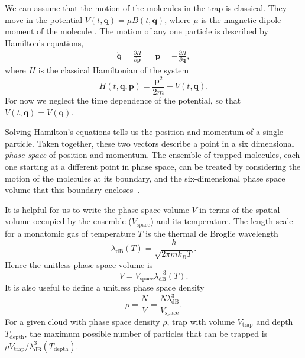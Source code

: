 We can assume that the motion of the molecules in the trap is classical. They
move in the potential $V(t, \mathbf{q}) = \mu B(t, \mathbf{q})$, where $\mu$ is
the magnetic dipole moment of the molecule .  The motion of any one particle is
described by Hamilton's equations,~\cite{Lichtenberg1969}
%
\begin{align}
  \label{design:eq:hamilton}
  \dot{\mathbf{q}} =  \frac{\partial H}{\partial \mathbf{p}} &&
  \dot{\mathbf{p}} = -\frac{\partial H}{\partial \mathbf{q}},
\end{align}
%
where $H$ is the classical Hamiltonian of the system
\begin{equation}
  H(t, \mathbf{q}, \mathbf{p}) = \frac{\mathbf{p}^2}{2m} + V(t, \mathbf{q}).
\end{equation}
For now we neglect the time dependence of the potential, so that $V(t,
\mathbf{q}) = V(\mathbf{q})$.

Solving Hamilton's equations tells us the position and momentum of a single
particle. Taken together, these two vectors describe a point in a six
dimensional \emph{phase space} of position and momentum. The ensemble of
trapped molecules, each one starting at a different point in phase space, can
be treated by considering the motion of the molecules at its
boundary, and the six-dimensional phase space volume that this
boundary encloses~\cite{Hand1998}.

It is helpful for us to write the phase space volume $V$ in terms of the
spatial volume occupied by the ensemble ($V_\text{space}$) and its temperature.
The length-scale for a monatomic gas of temperature $T$ is the thermal de
Broglie wavelength~\cite{blundell2}
%
\begin{equation}
  \lambda_\text{dB}(T) = \frac{h}{\sqrt{2 \pi m k_B T}}.
\end{equation}
%
Hence the unitless phase space volume is
%
\begin{equation}
  V = V_\text{space} \lambda_\text{dB}^{-3}(T).
\end{equation}
%
It is also useful to define a unitless phase space
density~\cite{PhysRevA.52.1423}
%
\begin{equation}
  \rho = \frac{N}{V} = \frac{N \lambda_\text{dB}^3}{V_\text{space}}.
\end{equation}
%
For a given cloud with phase space density $\rho$, trap with volume
$V_\text{trap}$ and depth $T_\text{depth}$,
the maximum possible number of particles that can be trapped is $\rho
V_\text{trap}/\lambda_\text{dB}^3(T_\text{depth})$.

